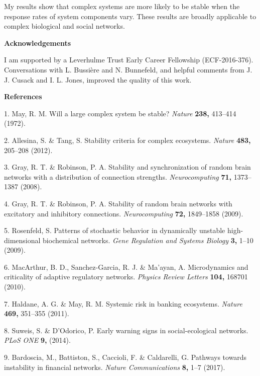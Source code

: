 \documentclass[]{article}
\begin{document}
My results show that complex systems are more likely to be stable when
the response rates of system components vary. These results are broadly
applicable to complex biological and social networks.

\textbf{Acknowledgements}

I am supported by a Leverhulme Trust Early Career Fellowship (ECF-2016-376).
Conversations with L. Bussi\`ere and N. Bunnefeld, and helpful comments from
J. J. Cusack and I. L. Jones, improved the quality of this work. 

\textbf{References}

\hypertarget{refs}{}
\hypertarget{ref-May1972}{}
1. May, R. M. Will a large complex system be stable? \emph{Nature}
\textbf{238,} 413--414 (1972).

\hypertarget{ref-Allesina2012}{}
2. Allesina, S. \& Tang, S. Stability criteria for complex ecosystems.
\emph{Nature} \textbf{483,} 205--208 (2012).

\hypertarget{ref-Gray2008}{}
3. Gray, R. T. \& Robinson, P. A. Stability and synchronization of
random brain networks with a distribution of connection strengths.
\emph{Neurocomputing} \textbf{71,} 1373--1387 (2008).

\hypertarget{ref-Gray2009}{}
4. Gray, R. T. \& Robinson, P. A. Stability of random brain networks
with excitatory and inhibitory connections. \emph{Neurocomputing}
\textbf{72,} 1849--1858 (2009).

\hypertarget{ref-Rosenfeld2009}{}
5. Rosenfeld, S. Patterns of stochastic behavior in dynamically unstable
high-dimensional biochemical networks. \emph{Gene Regulation and Systems
Biology} \textbf{3,} 1--10 (2009).

\hypertarget{ref-MacArthur2010}{}
6. MacArthur, B. D., Sanchez-Garcia, R. J. \& Ma'ayan, A. Microdynamics
and criticality of adaptive regulatory networks. \emph{Physics Review
Letters} \textbf{104,} 168701 (2010).

\hypertarget{ref-Haldane2011}{}
7. Haldane, A. G. \& May, R. M. Systemic risk in banking ecosystems.
\emph{Nature} \textbf{469,} 351--355 (2011).

\hypertarget{ref-Suweis2014}{}
8. Suweis, S. \& D'Odorico, P. Early warning signs in social-ecological
networks. \emph{PLoS ONE} \textbf{9,} (2014).

\hypertarget{ref-Bardoscia2017}{}
9. Bardoscia, M., Battiston, S., Caccioli, F. \& Caldarelli, G. Pathways
towards instability in financial networks. \emph{Nature Communications}
\textbf{8,} 1--7 (2017).
\end{document}
